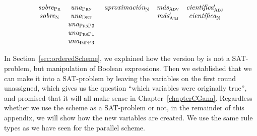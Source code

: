 \begin{equation}
\begin{array}{c c c c c}
\sobrePr & \unaPrn & \aproximacionN & \masAdv      & \cientifica{}'_\adj \\
\sobreN  & \unaDet &                & \mas{}'_\adj & \cientificaN \\
         & \unaPrsPThree \\
         & \unaPrsPOne \\
         & \unaImp \\
\end{array}
\end{equation}

In Section~\ref{sec:orderedScheme}, we explained how the version by \cite{lager_nivre01} is not a SAT-problem, but manipulation of Boolean expressions.
Then we established that we can make it into a SAT-problem by leaving the variables on the first round unassigned, which gives us the question ``which variables were originally true'', and promised that it will all make sense in Chapter~\ref{chapterCGana}. Regardless whether we use the scheme as a SAT-problem or not, in the remainder of this appendix, we will show how the new variables are created. 
We use the same rule types as we have seen for the parallel scheme.
















